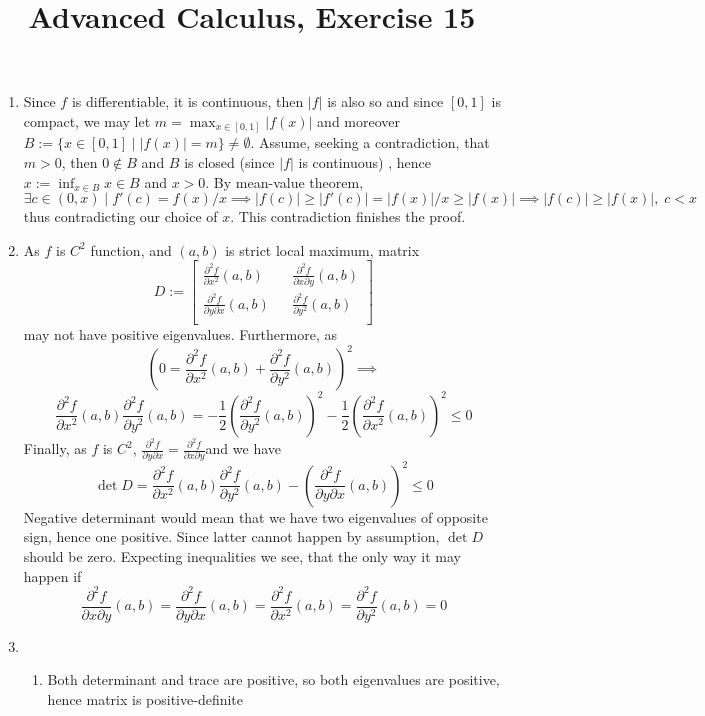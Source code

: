 \documentclass[8pt]{article} %
\title{Advanced Calculus, Exercise 15}
\begin{document}
\maketitle
\begin{enumerate}
\item{
Since $f$ is differentiable, it is continuous, then $|f|$ is also so and since $[0,1]$ is compact, we may let $\displaystyle m=\max_{x\in[0,1]}|f(x)|$ and
moreover $B:=\{x\in[0,1]\mid |f(x)|=m\}\neq \emptyset$. Assume, seeking a contradiction, that $m>0$, then $0\notin B$ and $B$ is closed (since $|f|$ is continuous)
, hence $\displaystyle x:=\inf_{x\in B} x\in B$ and $x>0$. By mean-value theorem, 
\[\exists c\in (0,x) \mid f'(c)=f(x)/x\implies |f(c)|\geq|f'(c)|=|f(x)|/x\geq |f(x)|\implies |f(c)|\geq |f(x)|,\;c<x\]
thus contradicting our choice of $x$. This contradiction finishes the proof.
}
\item{
As $f$ is $C^2$ function, and $(a,b)$ is strict local maximum, matrix
\[D:=\begin{bmatrix}
\frac{\partial^2 f}{\partial x^2}(a,b) && \frac{\partial^2 f}{\partial x\partial y}(a,b)\\
\frac{\partial^2 f}{\partial y \partial x}(a,b) && \frac{\partial^2 f}{\partial y^2}(a,b) \\
\end{bmatrix}\]
may not have positive eigenvalues. Furthermore, as
\[\left(0=\frac{\partial^2 f}{\partial x^2}(a,b)+\frac{\partial^2 f}{\partial y^2}(a,b)\right)^2\implies\]
\[\frac{\partial^2 f}{\partial x^2}(a,b)\frac{\partial^2 f}{\partial y^2}(a,b)=
-\frac{1}{2}\left(\frac{\partial^2 f}{\partial y^2}(a,b)\right)^2-\frac{1}{2}\left(\frac{\partial^2 f}{\partial x^2}(a,b)\right)^2\leq 0
\]
Finally, as $f$ is $C^2$, $\frac{\partial^2 f}{\partial y \partial x}=\frac{\partial^2 f}{\partial x \partial y}$and we have
\[\det D=\frac{\partial^2 f}{\partial x^2}(a,b)\frac{\partial^2 f}{\partial y^2}(a,b)-\left(\frac{\partial^2 f}{\partial y \partial x}(a,b)\right)^2\leq 0\]
Negative determinant would mean that we have two eigenvalues of opposite sign, hence one positive. Since latter cannot happen by assumption, $\det D$ should be zero.
Expecting inequalities we see, that the only way it may happen if
\[\frac{\partial^2 f}{\partial x \partial y}(a,b)=\frac{\partial^2 f}{\partial y \partial x}(a,b)=\frac{\partial^2 f}{\partial x^2}(a,b)=\frac{\partial^2 f}{\partial y^2}(a,b)=0\]
}
\item{
\begin{enumerate}[label=(\alph*)]
\item{Both determinant and trace are positive, so both eigenvalues are positive, hence matrix is positive-definite}

\end{enumerate}}
\end{enumerate}
\end{document}
